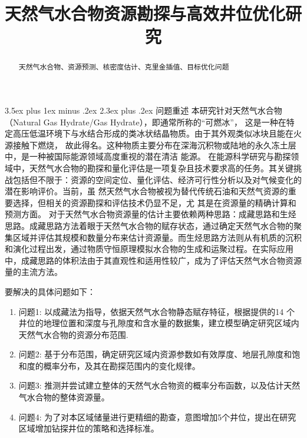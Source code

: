 \documentclass[12pt,a4paper]{nmmcm}
\title{{天然气水合物资源勘探与高效井位优化研究}}
\date{}
\makeatletter
\renewcommand\section{\@startsection{section}{1}{0pt}%
    {3.5ex plus 1ex minus .2ex}%
    {2.3ex plus .2ex}%
    {\normalfont\LARGE\bfseries}}
\makeatother
\begin{document}
\begin{abstract}
  

  \begin{keywords}
    {\song\xiaosihao
      {天然气水合物、资源预测、核密度估计、克里金插值、目标优化问题}}
  \end{keywords}

\end{abstract}
\maketitle
\renewcommand{\contentsname}{\centerline{\sanhao\bfseries\HEI 目\quad 录}}
\tableofcontents

\newpage
\setcounter{page}{1}
\pagestyle{fancy}
\section{问题重述}
本研究针对天然气水合物（Natural Gas Hydrate/Gas Hydrate），即通常所称的“可燃冰”，
这是一种在特定高压低温环境下与水结合形成的类冰状结晶物质。由于其外观类似冰块且能在火源接触下燃烧，
故此得名。这种物质主要分布在深海沉积物或陆地的永久冻土层中，是一种被国际能源领域高度重视的潜在清洁
能源。
在能源科学研究与勘探领域中，天然气水合物的勘探和量化评估是一项复杂且技术要求高的任务。其关键挑
战包括但不限于：资源的空间定位、量化评估、经济可行性分析以及对气候变化的潜在影响评价。当前，虽
然天然气水合物被视为替代传统石油和天然气资源的重要选择，但相关的资源勘探和评估技术仍显不足，尤
其是在资源量的精确计算和预测方面。
对于天然气水合物资源量的估计主要依赖两种思路：成藏思路和生烃思路。成藏思路方法着眼于天然气水合物的赋存状态，通过确定天然气水合物的聚集区域并评估其规模和数量分布来估计资源量。而生烃思路方法则从有机质的沉积和演化过程出发，通过物质守恒原理模拟水合物的生成和运聚过程。在实际应用中，成藏思路的体积法由于其直观性和适用性较广，成为了评估天然气水合物资源量的主流方法。

要解决的具体问题如下：
\begin{enumerate}
  \item
        问题1: 以成藏法为指导，依据天然气水合物静态赋存特征，根据提供的14 个井位的地理位置和深度与孔隙度和含水量的数据集，建立模型确定研究区域内天然气水合物的资源分布范围.
  \item
        问题2: 基于分布范围，确定研究区域内资源参数如有效厚度、地层孔隙度和饱和度的概率分布，及其在勘探范围内的变化规律。
  \item
        问题3: 推测并尝试建立整体的天然气水合物资的概率分布函数，以及估计天然气水合物的整体资源量。
  \item
        问题4: 为了对本区域储量进行更精细的勘查，意图增加5个井位，提出在研究区域增加钻探井位的策略和选择标准。
\end{enumerate}
\end{document}
